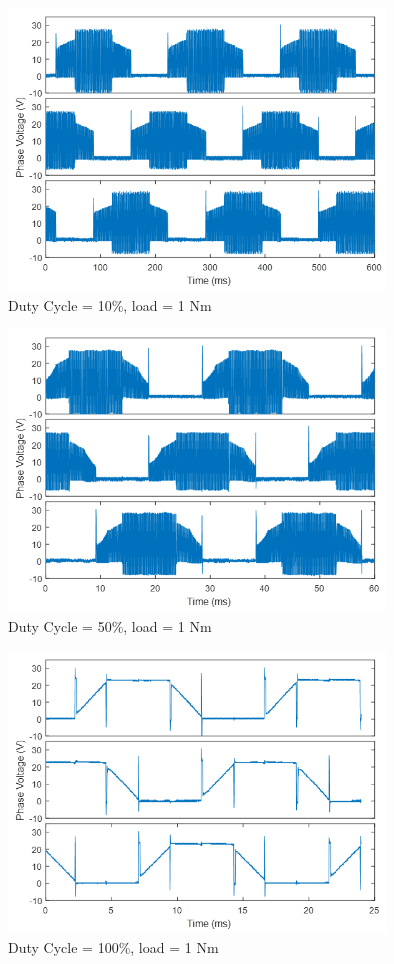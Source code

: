 \begin{figure}[h!p]
\centering
\includegraphics[width=10cm]{Images/waveforms/trap_4.png} 
\caption[trap4]{Duty Cycle = 10\%, load = 1 Nm}
\label{fig:trap4}
\end{figure}

\begin{figure}[h!p]
\centering
\includegraphics[width=10cm]{Images/waveforms/trap_5.png} 
\caption[trap5]{Duty Cycle = 50\%, load = 1 Nm}
\label{fig:trap5}
\end{figure}

\begin{figure}[h!p]
\centering
\includegraphics[width=10cm]{Images/waveforms/trap_6.png} 
\caption[trap6]{Duty Cycle = 100\%, load = 1 Nm}
\label{fig:trap6}
\end{figure}

